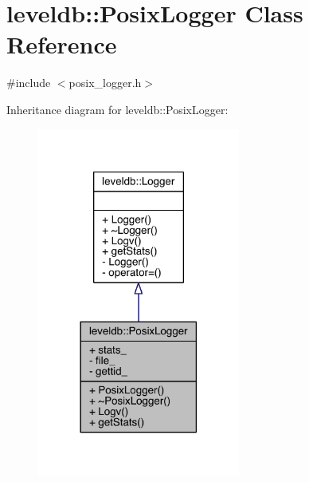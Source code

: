 \hypertarget{classleveldb_1_1_posix_logger}{}\section{leveldb\+:\+:Posix\+Logger Class Reference}
\label{classleveldb_1_1_posix_logger}


{\ttfamily \#include $<$posix\+\_\+logger.\+h$>$}



Inheritance diagram for leveldb\+:\+:Posix\+Logger\+:
\nopagebreak
\begin{figure}[H]
\begin{center}
\leavevmode
\includegraphics[width=189pt]{classleveldb_1_1_posix_logger__inherit__graph}
\end{center}
\end{figure}


